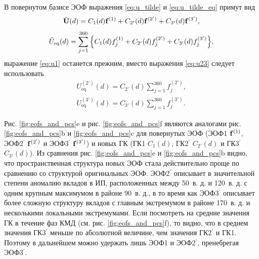 В повернутом базисе ЭОФ выражения \eqref{eq:u_tilde} и \eqref{eq:u_tilde_eq} примут вид
\begin{equation}
    \Tilde{\vb{U}}(d) = C_1(d) \vb{f}^{(1)} + C_{2'}(d) \vb{f}^{(2')} + C_{3'}(d) \vb{f}^{(3')},
\end{equation}
\begin{equation}
\label{eq:u_tilde_eq_new}
    \Tilde{U}_{\mathrm{eq}}(d) =\sum\limits_{j=1}^{360} \qty{C_1(d) {f}_j^{(1)} + C_{2'}(d) {f}_j^{(2')} + C_{3'}(d) {f}_j^{(3')}},
\end{equation}
выражение \eqref{eq:u1} останется прежним, вместо выражения \eqref{eq:u23} следует использовать
\begin{equation}
    \begin{split}
        U_\mathrm{eq}^{(2')} (d) = C_{2'}(d) \sum\limits_{j=1}^{360} {f}_j^{(2')},\\
        U_\mathrm{eq}^{(3')} (d) = C_{3'}(d) \sum\limits_{j=1}^{360} {f}_j^{(3')}.
    \end{split}
\end{equation}

Рис. \ref{fig:eofs_and_pcs}{e} и рис. \ref{fig:eofs_and_pcs}{f} являются аналогами рис. \ref{fig:eofs_and_pcs}{b} и \ref{fig:eofs_and_pcs}{c} для повернутых ЭОФ (ЭОФ1 $\vb{f}^{(1)}$, ЭОФ2$^\prime$ $\vb{f}^{(2')}$ и ЭОФ3$^\prime$ $\vb{f}^{(3')}$) и новых ГК (ГК1 $C_1(d)$, ГК2$^\prime$ $C_{2'}(d)$ и ГК3$^\prime$ $C_{3'}(d)$). Из сравнения рис. \ref{fig:eofs_and_pcs}{e} и \ref{fig:eofs_and_pcs}{b} видно, что пространственная структура новых ЭОФ стала действительно проще по сравнению со структурой оригинальных ЭОФ. ЭОФ2$^\prime$ описывает в значительной степени аномалию вкладов в ИП, расположенных между 50\textdegree\ в. д. и 120\textdegree\ в. д. с одним крупным максимумом в районе 90\textdegree\ в. д., в то время как ЭОФ3$^\prime$ описывает более сложную структуру вкладов с главным экстремумом в районе 170\textdegree\ в. д. и несколькими локальными экстремумами. Если посмотреть на средние значения ГК в течение фаз КМД (см. рис. \ref{fig:eofs_and_pcs}{f}), то видно, что в среднем значения ГК3$^\prime$ меньше по абсолютной величине, чем значения ГК2$^\prime$ и ГК1. Поэтому в дальнейшем можно удержать лишь ЭОФ1 и ЭОФ2$^\prime$, пренебрегая ЭОФ3$^\prime$.

